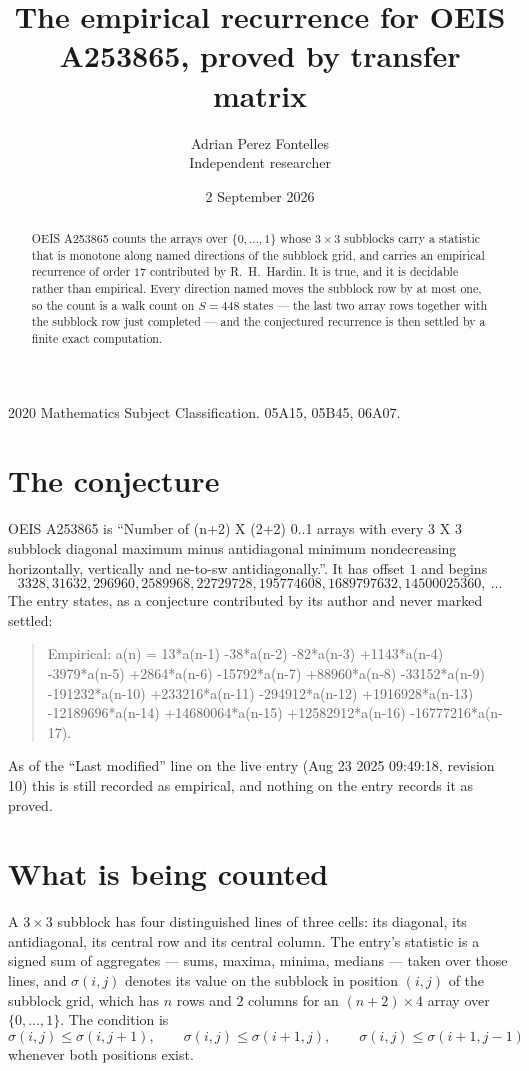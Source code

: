 \documentclass[11pt,a4paper]{article}
\title{The empirical recurrence for OEIS A253865, proved by transfer matrix}
\author{Adrian Perez Fontelles\\ \small Independent researcher}
\date{2 September 2026}
\theoremstyle{plain}
\theoremstyle{definition}
\begin{document}
\maketitle

\begin{abstract}
OEIS A253865 counts the arrays over $\{0,\dots,1\}$ whose $3\times3$ subblocks carry a
statistic that is monotone along named directions of the subblock grid, and carries an
empirical recurrence of order $17$ contributed by R.~H.~Hardin. It is true, and it is
decidable rather than empirical. Every direction named moves the subblock row by at most one,
so the count is a walk count on $S=448$ states --- the last two array rows together with the
subblock row just completed --- and the conjectured recurrence is then settled by a finite
exact computation.
\end{abstract}

\noindent\small 2020 Mathematics Subject Classification. 05A15, 05B45, 06A07.\normalsize

\section{The conjecture}

OEIS A253865 is ``Number of (n+2) X (2+2) 0..1 arrays with every 3 X 3 subblock diagonal maximum minus antidiagonal minimum nondecreasing horizontally, vertically and ne-to-sw antidiagonally.''. It has offset $1$ and begins
\[
3328, 31632, 296960, 2589968, 22729728, 195774608, 1689797632, 14500025360,\ \dots
\]
The entry states, as a conjecture contributed by its author and never marked settled:
\begin{quote}
Empirical: a(n) = 13*a(n-1) -38*a(n-2) -82*a(n-3) +1143*a(n-4) -3979*a(n-5) +2864*a(n-6) -15792*a(n-7) +88960*a(n-8) -33152*a(n-9) -191232*a(n-10) +233216*a(n-11) -294912*a(n-12) +1916928*a(n-13) -12189696*a(n-14) +14680064*a(n-15) +12582912*a(n-16) -16777216*a(n-17).
\end{quote}
As of the ``Last modified'' line on the live entry (Aug 23 2025 09:49:18, revision 10) this is still
recorded as empirical, and nothing on the entry records it as proved.

\section{What is being counted}

A $3\times3$ subblock has four distinguished lines of three cells: its diagonal, its
antidiagonal, its central row and its central column. The entry's statistic is a signed sum of
aggregates --- sums, maxima, minima, medians --- taken over those lines, and $\sigma(i,j)$
denotes its value on the subblock in position $(i,j)$ of the subblock grid, which has $n$ rows
and $2$ columns for an $(n+2)\times4$ array over $\{0,\dots,1\}$. The condition is
\[
\sigma(i,j)\le\sigma(i,j+1),\qquad \sigma(i,j)\le\sigma(i+1,j),\qquad \sigma(i,j)\le\sigma(i+1,j-1)
\]
whenever both positions exist.
\end{document}
